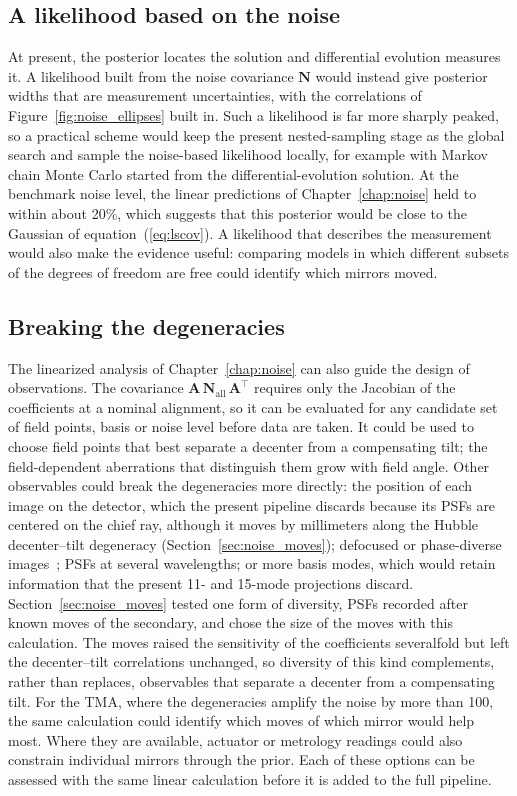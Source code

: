 \subsection{A likelihood based on the noise}
At present, the posterior locates the solution and differential evolution measures it. A likelihood built from the noise covariance $\mathbf{N}$ would instead give posterior widths that are measurement uncertainties, with the correlations of Figure~\ref{fig:noise_ellipses} built in. Such a likelihood is far more sharply peaked, so a practical scheme would keep the present nested-sampling stage as the global search and sample the noise-based likelihood locally, for example with Markov chain Monte Carlo started from the differential-evolution solution. At the benchmark noise level, the linear predictions of Chapter~\ref{chap:noise} held to within about 20\%, which suggests that this posterior would be close to the Gaussian of equation~(\ref{eq:lscov}). A likelihood that describes the measurement would also make the evidence useful: comparing models in which different subsets of the degrees of freedom are free could identify which mirrors moved.

\subsection{Breaking the degeneracies}
The linearized analysis of Chapter~\ref{chap:noise} can also guide the design of observations. The covariance $\mathbf{A}\,\mathbf{N}_{\mathrm{all}}\,\mathbf{A}^{\top}$ requires only the Jacobian of the coefficients at a nominal alignment, so it can be evaluated for any candidate set of field points, basis or noise level before data are taken. It could be used to choose field points that best separate a decenter from a compensating tilt; the field-dependent aberrations that distinguish them grow with field angle. Other observables could break the degeneracies more directly: the position of each image on the detector, which the present pipeline discards because its PSFs are centered on the chief ray, although it moves by millimeters along the Hubble decenter--tilt degeneracy (Section~\ref{sec:noise_moves}); defocused or phase-diverse images~\citep{Gonsalves1982}; PSFs at several wavelengths; or more basis modes, which would retain information that the present 11- and 15-mode projections discard. Section~\ref{sec:noise_moves} tested one form of diversity, PSFs recorded after known moves of the secondary, and chose the size of the moves with this calculation. The moves raised the sensitivity of the coefficients severalfold but left the decenter--tilt correlations unchanged, so diversity of this kind complements, rather than replaces, observables that separate a decenter from a compensating tilt. For the TMA, where the degeneracies amplify the noise by more than 100, the same calculation could identify which moves of which mirror would help most. Where they are available, actuator or metrology readings could also constrain individual mirrors through the prior. Each of these options can be assessed with the same linear calculation before it is added to the full pipeline.

